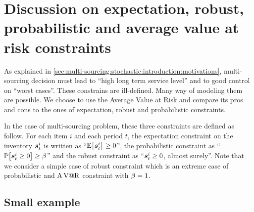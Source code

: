 \section{Discussion on expectation, robust, probabilistic and average value at risk constraints}
\label{sec:multi-sourcing:stochastic:discussion}


As explained in \cref{sec:multi-sourcing:stochastic:introduction:motivations}, multi-sourcing decision must lead to ``high long term service level'' and to good control on ``worst cases''.
These constrains are ill-defined.
Many way of modeling them are possible.
We choose to use the Average Value at Risk and compare its pros and cons to the ones of expectation, robust and probabilistic constraints.


In the case of multi-sourcing problem, these three constraints are defined as follow.
For each item $i$ and each period $t$, the expectation constraint on the inventory $\va\inventory_t^i$ is written as ``$\espe\sqbracket{\va\inventory_t^i}\ge0$'', the probabilistic constraint as ``$\prob\sqbracket{\va\inventory_t^i\ge0}\ge\servicelvl$'' and the robust constraint as ``$\va\inventory_t^i\ge0$, almost surely''.
Note that we consider a simple case of robust constraint which is an extreme case of probabilistic and $\operatorname{A\operatorname{V@R}}$ constraint with $\beta=1$.




\subsection{Small example}
\label{sec:multi-sourcing:stochastic:discussion:small-example}


